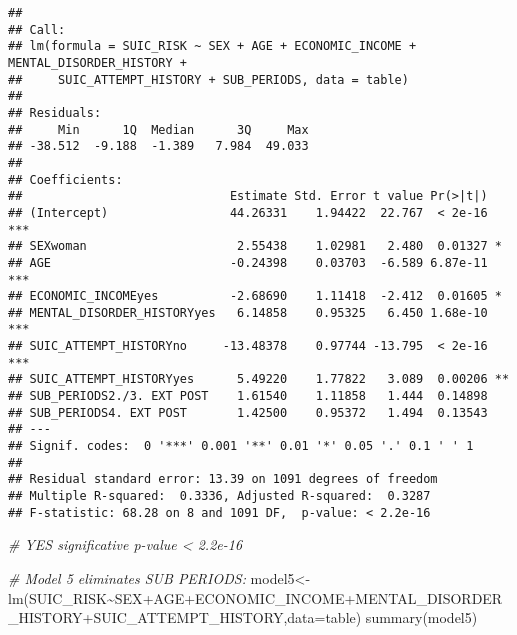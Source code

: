 \documentclass[
]{book}
\newenvironment{Shaded}{\begin{snugshade}}{\end{snugshade}}
\newcommand{\AttributeTok}[1]{\textcolor[rgb]{0.77,0.63,0.00}{#1}}
\newcommand{\CommentTok}[1]{\textcolor[rgb]{0.56,0.35,0.01}{\textit{#1}}}
\newcommand{\FunctionTok}[1]{\textcolor[rgb]{0.00,0.00,0.00}{#1}}
\newcommand{\NormalTok}[1]{#1}
\newcommand{\OtherTok}[1]{\textcolor[rgb]{0.56,0.35,0.01}{#1}}
\newcommand{\SpecialCharTok}[1]{\textcolor[rgb]{0.00,0.00,0.00}{#1}}
\begin{document}
\begin{verbatim}
## 
## Call:
## lm(formula = SUIC_RISK ~ SEX + AGE + ECONOMIC_INCOME + MENTAL_DISORDER_HISTORY + 
##     SUIC_ATTEMPT_HISTORY + SUB_PERIODS, data = table)
## 
## Residuals:
##     Min      1Q  Median      3Q     Max 
## -38.512  -9.188  -1.389   7.984  49.033 
## 
## Coefficients:
##                             Estimate Std. Error t value Pr(>|t|)    
## (Intercept)                 44.26331    1.94422  22.767  < 2e-16 ***
## SEXwoman                     2.55438    1.02981   2.480  0.01327 *  
## AGE                         -0.24398    0.03703  -6.589 6.87e-11 ***
## ECONOMIC_INCOMEyes          -2.68690    1.11418  -2.412  0.01605 *  
## MENTAL_DISORDER_HISTORYyes   6.14858    0.95325   6.450 1.68e-10 ***
## SUIC_ATTEMPT_HISTORYno     -13.48378    0.97744 -13.795  < 2e-16 ***
## SUIC_ATTEMPT_HISTORYyes      5.49220    1.77822   3.089  0.00206 ** 
## SUB_PERIODS2./3. EXT POST    1.61540    1.11858   1.444  0.14898    
## SUB_PERIODS4. EXT POST       1.42500    0.95372   1.494  0.13543    
## ---
## Signif. codes:  0 '***' 0.001 '**' 0.01 '*' 0.05 '.' 0.1 ' ' 1
## 
## Residual standard error: 13.39 on 1091 degrees of freedom
## Multiple R-squared:  0.3336, Adjusted R-squared:  0.3287 
## F-statistic: 68.28 on 8 and 1091 DF,  p-value: < 2.2e-16
\end{verbatim}

\begin{Shaded}
\begin{Highlighting}[]
\CommentTok{\# YES significative p{-}value \textless{} 2.2e{-}16}

\CommentTok{\# Model 5 eliminates SUB PERIODS:}
\NormalTok{model5}\OtherTok{\textless{}{-}}\FunctionTok{lm}\NormalTok{(SUIC\_RISK}\SpecialCharTok{\textasciitilde{}}\NormalTok{SEX}\SpecialCharTok{+}\NormalTok{AGE}\SpecialCharTok{+}\NormalTok{ECONOMIC\_INCOME}\SpecialCharTok{+}\NormalTok{MENTAL\_DISORDER\_HISTORY}\SpecialCharTok{+}\NormalTok{SUIC\_ATTEMPT\_HISTORY,}\AttributeTok{data=}\NormalTok{table)}
\FunctionTok{summary}\NormalTok{(model5)}
\end{Highlighting}
\end{Shaded}
\end{document}
